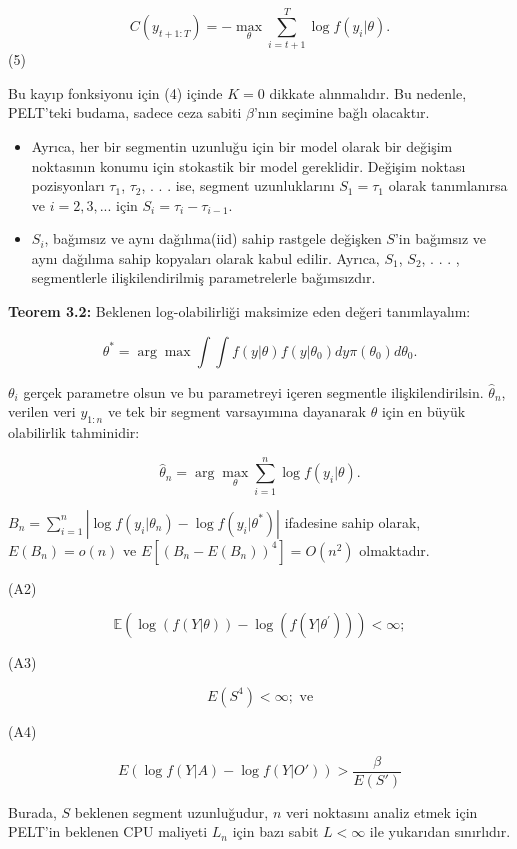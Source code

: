 \documentclass[12pt,twoside]{deuthesis}
\providecommand{\tightlist}{%
  \setlength{\itemsep}{0pt}\setlength{\parskip}{0pt}}
\begin{document}
\[ C(y_{t+1:T}) = - \max_{\theta} \sum_{i=t+1}^{T} \log f(y_i|\theta). \] (5)

Bu kayıp fonksiyonu için (4) içinde \(K = 0\) dikkate alınmalıdır. Bu nedenle, PELT'teki budama, sadece ceza sabiti \(\beta\)'nın seçimine bağlı olacaktır.

\begin{itemize}
\tightlist
\item
  Ayrıca, her bir segmentin uzunluğu için bir model olarak bir değişim noktasının konumu için stokastik bir model gereklidir. Değişim noktası pozisyonları \(\tau_1\), \(\tau_2\), . . . ise, segment uzunluklarını \(S_1 = \tau_1\) olarak tanımlanırsa ve \(i = 2, 3, . . .\) için \(S_i = \tau_i - \tau_{i-1}\).
\item
  \(S_i\), bağımsız ve aynı dağılıma(iid) sahip rastgele değişken \(S\)'in bağımsız ve aynı dağılıma sahip kopyaları olarak kabul edilir. Ayrıca, \(S_1\), \(S_2\), . . . , segmentlerle ilişkilendirilmiş parametrelerle bağımsızdır.
\end{itemize}

\textbf{Teorem 3.2:} Beklenen log-olabilirliği maksimize eden değeri tanımlayalım:

\[ \theta^* = \arg\max \int \int f(y|\theta)f(y|\theta_0)dy\pi(\theta_0)d\theta_0. \]

\(\theta_i\) gerçek parametre olsun ve bu parametreyi içeren segmentle ilişkilendirilsin. \(\hat{\theta}_n\), verilen veri \(y_{1:n}\) ve tek bir segment varsayımına dayanarak \(\theta\) için en büyük olabilirlik tahminidir:

\[ \hat{\theta}_n = \arg\max_{\theta} \sum_{i=1}^n \log f(y_i|\theta). \]

\(B_n = \sum_{i=1}^n \left| \log f(y_i|\theta_n) - \log f(y_i|\theta^*) \right|\) ifadesine sahip olarak, \(E(B_n) = o(n)\) ve \(E[(B_n - E(B_n))^4] = O(n^2)\) olmaktadır.

(A2)

\[ \mathbb{E} \left( \log(f(Y|\theta)) - \log(f(Y|\theta^{'})) \right) < \infty; \]

(A3)

\[ E(S^4) < \infty; \text{ ve} \]

(A4)

\[ E\left(\log f(Y|A) - \log f(Y|O')\right) > \frac{\beta}{E(S')} \]

Burada, \(S\) beklenen segment uzunluğudur, \(n\) veri noktasını analiz etmek için PELT'in beklenen CPU maliyeti \(L_n\) için bazı sabit \(L < \infty\) ile yukarıdan sınırlıdır.
\end{document}
